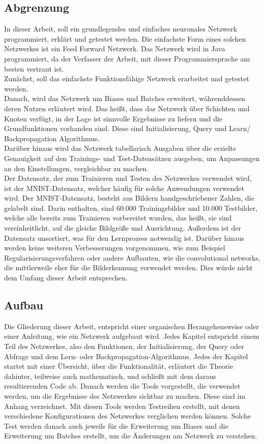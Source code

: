 \documentclass[12pt]{article}
\begin{document}
\subsection{Abgrenzung}
In dieser Arbeit, soll ein grundlegendes und einfaches neuronales Netzwerk programmiert, erklärt und getestet werden. Die einfachste Form eines solchen Netzwerkes ist ein Feed Forward Netzwerk. 
Das Netzwerk wird in Java programmiert, da der Verfasser der Arbeit, mit dieser Programmiersprache am besten vertraut ist.\\
Zunächst, soll das einfachste Funktionsfähige Netzwerk erarbeitet und getestet werden.\\
Danach, wird das Netzwerk um Biases und Batches erweitert, währenddessen deren Nutzen erläutert wird. Das heißt, dass das Netzwerk über Schichten und Knoten verfügt, in der Lage ist sinnvolle Ergebnisse zu liefern und die Grundfunktionen vorhanden sind. Diese sind Initialisierung, Query und Learn/ Backpropagation Algorithmus. \\
Darüber hinaus wird das Netzwerk tabellarisch Ausgaben über die erzielte Genauigkeit auf den Trainings- und Test-Datensätzen ausgeben, um Anpassungen an den Einstellungen, vergleichbar zu machen.  \\
Der Datensatz, der zum Trainieren und Testen des Netzwerkes verwendet wird, ist der MNIST-Datensatz, welcher häufig für solche Anwendungen verwendet wird. Der MNIST-Datensatz, besteht aus Bildern handgeschriebener Zahlen, die gelabelt sind. Darin enthalten, sind 60.000 Trainingsbilder und 10.000 Testbilder, welche alle bereits zum Trainieren vorbereitet wurden, das heißt, sie sind vereinheitlicht, auf die gleiche Bildgröße und Ausrichtung. Außerdem ist der Datensatz unsortiert, was für den Lernprozess notwendig ist.
Darüber hinaus werden keine weiteren Verbesserungen vorgenommen, wie zum Beispiel Regularisierungsverfahren oder andere Aufbauten, wie die convolutional networks, die mittlerweile eher für die Bilderkennung verwendet werden. Dies würde nicht dem Umfang dieser Arbeit entsprechen.
\subsection{Aufbau}
Die Gliederung dieser Arbeit, entspricht einer organischen Herangehensweise oder einer Anleitung, wie ein Netzwerk aufgebaut wird. Jedes Kapitel entspricht einem Teil des Netzwerkes, also den Funktionen, der Initialisierung, der Query oder Abfrage und dem Lern- oder Backpropagation-Algorithmus. Jedes der Kapitel startet mit einer Übersicht, über die Funktionalität, erläutert die Theorie dahinter, teilweise auch mathematisch, und schließt mit dem daraus resultierenden Code ab. 
Danach werden die Tools vorgestellt, die verwendet werden, um die Ergebnisse des Netzwerkes sichtbar zu machen. Diese sind im Anhang verzeichnet. 
Mit diesen Tools werden Testreihen erstellt, mit denen verschiedene Konfigurationen des Netzwerkes verglichen werden können. Solche Test werden danach auch jeweils für die Erweiterung um Biases und die Erweiterung um Batches erstellt, um die Änderungen am Netzwerk zu verstehen.
\end{document}
